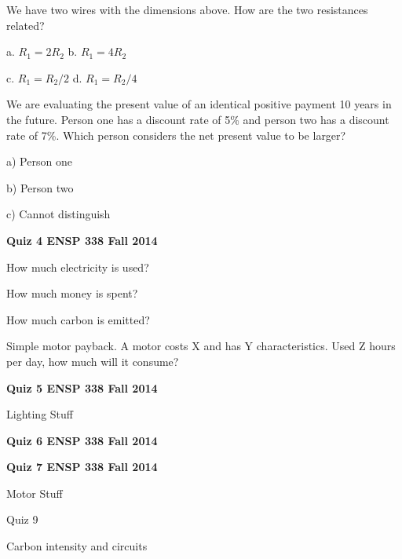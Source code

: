 \documentclass[12pt, oneside]{article}
\begin{document}
We have two wires with the dimensions above.
How are the two resistances related?

a. $R_1 = 2 R_2$ \hfill b. $R_1 = 4 R_2$

c. $R_1 = R_2 / 2 $ \hfill d. $R_1 = R_2 / 4 $


\problem{}
We are evaluating the present value of an identical positive payment 10 years in the
future.  Person one has a discount rate of 5\% and person two has a
discount rate of 7\%.  Which person considers the net present value to
be larger?

a) Person one

b) Person two

c) Cannot distinguish

\newpage
{\bf Quiz 4 \hfill ENSP 338 \hfill Fall 2014}




\problem{}
How much electricity is used?

\problem{}
How much money is spent?

\problem{}
How much carbon is emitted?

\problem{}
Simple motor payback.  A motor costs X and has Y characteristics.  Used
Z hours per day, how much will it consume?

\newpage
{\bf Quiz 5 \hfill ENSP 338 \hfill Fall 2014}

Lighting Stuff


\newpage
{\bf Quiz 6 \hfill ENSP 338 \hfill Fall 2014}




\newpage
{\bf Quiz 7 \hfill ENSP 338 \hfill Fall 2014}

Motor Stuff



\newpage
Quiz 9

Carbon intensity and circuits
\end{document}
